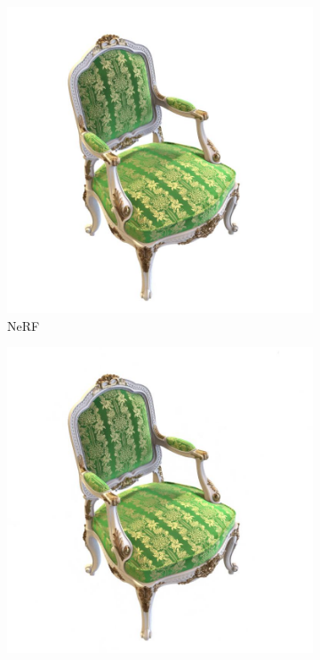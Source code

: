 \documentclass[12pt, a4paper, twoside]{book}
\numberwithin{equation}{chapter}
\numberwithin{theorem}{section}
\numberwithin{definition}{section}
\numberwithin{definitionChapter}{chapter}
\begin{document}
\begin{figure}[H]
\begin{subfigure}{0.475\textwidth}
			\includegraphics[scale=0.25]{img/nerf/nerf_chair_38.jpg}
			\caption{NeRF}
		\end{subfigure}
		\begin{subfigure}{0.475\textwidth}
			\centering
			\includegraphics[scale=0.25]{img/mipnerf/mipnerf_chair_38.jpg}

\end{subfigure}
\end{figure}
\end{document}
